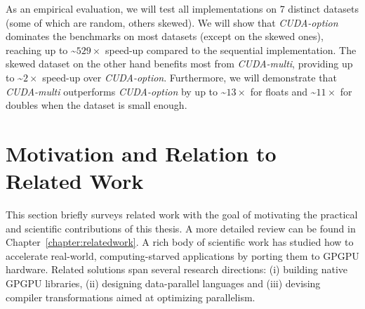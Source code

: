 As an empirical evaluation, we will test all implementations on 7 distinct datasets (some of which are random, others skewed). We will show that \textit{CUDA-option} dominates the benchmarks on most datasets (except on the skewed ones), reaching up to \textasciitilde$529\times$ speed-up compared to the sequential implementation. The skewed dataset on the other hand benefits most from \textit{CUDA-multi}, providing up to \textasciitilde$2\times$ speed-up over \textit{CUDA-option}. Furthermore, we will demonstrate that \textit{CUDA-multi} outperforms  \textit{CUDA-option} by up to \textasciitilde$13\times$ for floats and \textasciitilde$11\times$ for doubles when the dataset is small enough. 




\newpage
\section{Motivation and Relation to Related Work}
\label{section:briefsurveyofrelatedsolutions}

This section briefly surveys related work with the goal of motivating the practical and scientific contributions of this thesis. A more detailed review can be found in Chapter~\ref{chapter:relatedwork}.
%
A rich body of scientific work has studied how to accelerate real-world, computing-starved applications by porting them to GPGPU hardware. Related solutions span several research directions: (i) building native GPGPU libraries, (ii) designing data-parallel languages and (iii) devising compiler transformations aimed at optimizing parallelism.

